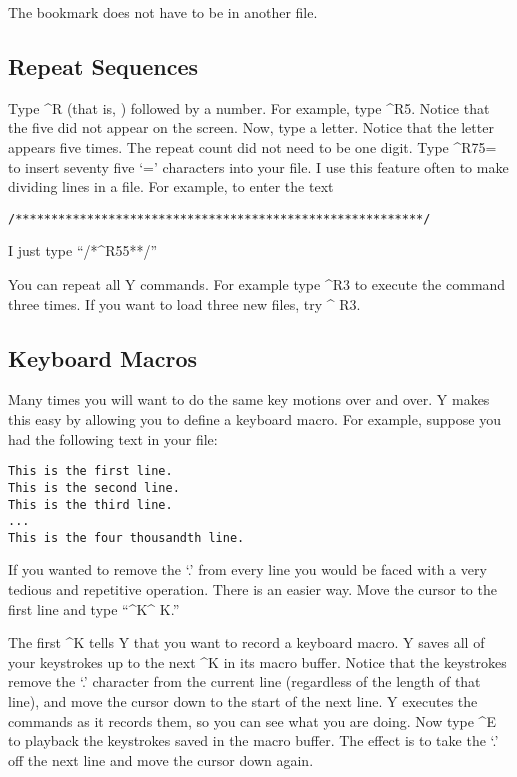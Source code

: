 The bookmark does not have to be in another file.

\subsection{Repeat Sequences}

Type \textasciicircum R (that is, ) followed by a number. For example, type
\textasciicircum R5. Notice that the five did not appear on the screen. Now, type a letter.
Notice that the letter appears five times. The repeat count did not need to be one digit. Type
\textasciicircum R75= to insert seventy five `=' characters into your file. I use this feature
often to make dividing lines in a file. For example, to enter the text

\begin{verbatim}
/*********************************************************/
\end{verbatim}

I just type ``/*\textasciicircum R55**/''

You can repeat all Y commands. For example type \textasciicircum R3 to execute the
 command three times. If you want to load three new files, try \textasciicircum
R3.

\subsection{Keyboard Macros}

Many times you will want to do the same key motions over and over. Y makes this easy by allowing
you to define a keyboard macro. For example, suppose you had the following text in your file:

\begin{verbatim}
This is the first line.
This is the second line.
This is the third line.
...
This is the four thousandth line.
\end{verbatim}

If you wanted to remove the `.' from every line you would be faced with a very tedious and
repetitive operation. There is an easier way. Move the cursor to the first line and type
``\textasciicircum K\textasciicircum
K.''

The first \textasciicircum K tells Y that you want to record a keyboard macro. Y saves all of
your keystrokes up to the next \textasciicircum K in its macro buffer. Notice that the
keystrokes remove the `.' character from the current line (regardless of the length of that
line), and move the cursor down to the start of the next line. Y executes the commands as it
records them, so you can see what you are doing. Now type \textasciicircum E to playback the
keystrokes saved in the macro buffer. The effect is to take the `.' off the next line and move
the cursor down again.

